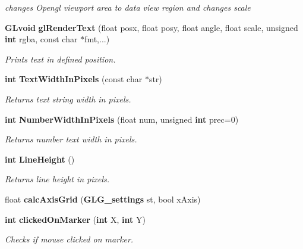 \begin{DoxyCompactItemize}
\begin{DoxyCompactList}\small\item\em changes Opengl viewport area to data view region and changes scale \end{DoxyCompactList}\item 
{\bf G\+Lvoid} {\bf gl\+Render\+Text} (float posx, float posy, float angle, float scale, unsigned {\bf int} rgba, const char $\ast$fmt,...)
\begin{DoxyCompactList}\small\item\em Prints text in defined position. \end{DoxyCompactList}\item 
{\bf int} {\bf Text\+Width\+In\+Pixels} (const char $\ast$str)
\begin{DoxyCompactList}\small\item\em Returns text string width in pixels. \end{DoxyCompactList}\item 
{\bf int} {\bf Number\+Width\+In\+Pixels} (float num, unsigned {\bf int} prec=0)
\begin{DoxyCompactList}\small\item\em Returns number text width in pixels. \end{DoxyCompactList}\item 
{\bf int} {\bf Line\+Height} ()
\begin{DoxyCompactList}\small\item\em Returns line height in pixels. \end{DoxyCompactList}\item 
float {\bf calc\+Axis\+Grid} ({\bf G\+L\+G\+\_\+settings} st, bool x\+Axis)
\item 
{\bf int} {\bf clicked\+On\+Marker} ({\bf int} X, {\bf int} Y)
\begin{DoxyCompactList}\small\item\em Checks if mouse clicked on marker. \end{DoxyCompactList}\end{DoxyCompactItemize}
